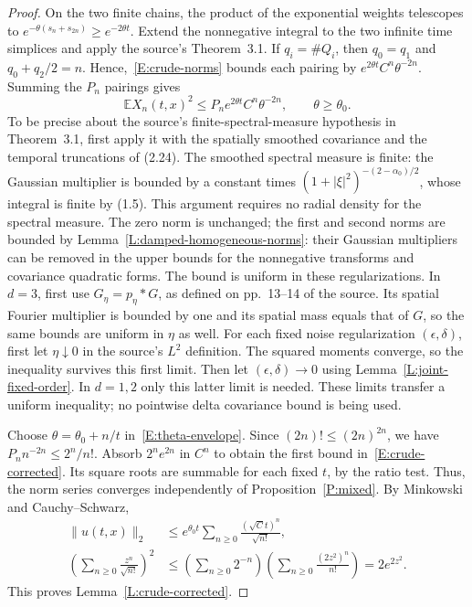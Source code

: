 \documentclass[12pt]{article}
\numberwithin{equation}{section}
\theoremstyle{definition}
\newcommand{\E}{\mathbb{E}}
\begin{document}
\begin{proof}
  On the two finite chains, the product of the exponential weights
  telescopes to $e^{-\theta(s_n+s_{2n})}\ge e^{-2\theta t}$.
  Extend the nonnegative integral to the two infinite time simplices
  and apply the source's Theorem~3.1. If $q_i=\#Q_i$, then
  $q_0=q_1$ and $q_0+q_2/2=n$. Hence,~\eqref{E:crude-norms} bounds
  each pairing by $e^{2\theta t}C^n\theta^{-2n}$.
  Summing the $P_n$ pairings gives
  \begin{equation}\label{E:theta-envelope}
    \E X_n(t,x)^2\le P_n e^{2\theta t}C^n\theta^{-2n},
    \qquad\theta\ge\theta_0.
  \end{equation}
  To be precise about the source's finite-spectral-measure hypothesis in
  Theorem~3.1, first apply it with the spatially smoothed covariance and
  the temporal truncations of (2.24). The smoothed spectral measure is
  finite: the Gaussian multiplier is bounded by a constant times
  $(1+|\xi|^2)^{-(2-\alpha_0)/2}$, whose integral is finite by (1.5).
  This argument requires no radial density for the spectral measure.
  The zero norm is unchanged; the
  first and second norms are bounded by
  Lemma~\ref{L:damped-homogeneous-norms}: their Gaussian multipliers
  can be removed in the upper bounds for the nonnegative transforms
  and covariance quadratic forms. The bound is
  uniform in these regularizations. In $d=3$, first use
  $G_\eta=p_\eta*G$, as defined on pp.~13--14 of the source. Its
  spatial Fourier multiplier is bounded by one and its spatial mass
  equals that of $G$, so the same bounds are uniform in $\eta$ as well.
  For each fixed noise regularization $(\epsilon,\delta)$, first let
  $\eta\downarrow0$ in the source's $L^2$ definition. The squared
  moments converge, so the inequality survives this first limit.
  Then let $(\epsilon,\delta)\to0$ using Lemma~\ref{L:joint-fixed-order}. In $d=1,2$ only
  this latter limit is needed. These limits transfer a uniform inequality;
  no pointwise delta covariance bound is being used.

  Choose $\theta=\theta_0+n/t$ in~\eqref{E:theta-envelope}. Since
  $(2n)!\le(2n)^{2n}$, we have $P_n n^{-2n}\le2^n/n!$.
  Absorb $2^ne^{2n}$ in $C^n$ to obtain the first bound
  in~\eqref{E:crude-corrected}. Its square roots are summable for each
  fixed $t$, by the ratio test. Thus, the norm series converges independently
  of Proposition~\ref{P:mixed}. By Minkowski and Cauchy--Schwarz,
  \[
    \begin{split}
      \|u(t,x)\|_2
      &\le e^{\theta_0t}\sum_{n\ge0}\frac{(\sqrt C t)^n}{\sqrt{n!}},\\
      \left(\sum_{n\ge0}\frac{z^n}{\sqrt{n!}}\right)^2
      &\le\left(\sum_{n\ge0}2^{-n}\right)
      \left(\sum_{n\ge0}\frac{(2z^2)^n}{n!}\right)
      =2e^{2z^2}.
    \end{split}
  \]
  This proves Lemma~\ref{L:crude-corrected}.
\end{proof}
\end{document}
